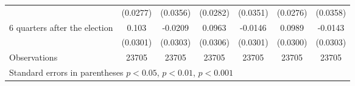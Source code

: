 \begin{table}[!ht]
\begin{tabular}{l*{6}{c}}
                    &    (0.0277)         &    (0.0356)         &    (0.0282)         &    (0.0351)         &    (0.0276)         &    (0.0358)         \\
[0,12em]
 6 quarters after the election&       0.103\sym{***}&     -0.0209         &      0.0963\sym{**} &     -0.0146         &      0.0989\sym{***}&     -0.0143         \\
                    &    (0.0301)         &    (0.0303)         &    (0.0306)         &    (0.0301)         &    (0.0300)         &    (0.0303)         \\
\hline
Observations        &       23705         &       23705         &       23705         &       23705         &       23705         &       23705         \\
\hline\hline
\multicolumn{7}{l}{ Standard errors in parentheses \sym{*} \(p<0.05\), \sym{**} \(p<0.01\), \sym{***} \(p<0.001\)}\\
\end{tabular}
\end{table}
